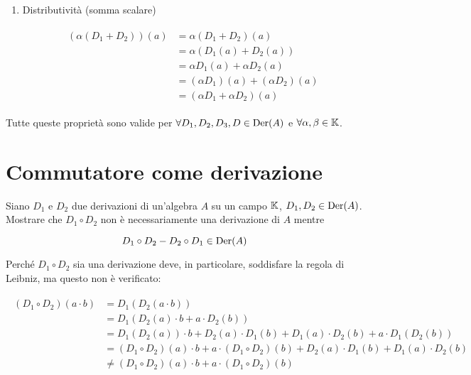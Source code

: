 \begin{enumerate}
	\item Distributività (somma scalare)
	
	\begin{align}
		\begin{split}
			(\alpha (D_{1} + D_{2})) (a) &= \alpha (D_{1} + D_{2}) (a)\\
			&= \alpha (D_{1} (a) + D_{2} (a))\\
			&= \alpha D_{1} (a) + \alpha D_{2} (a)\\
			&= (\alpha D_{1}) (a) + (\alpha D_{2}) (a)\\
			&= (\alpha D_{1} + \alpha D_{2}) (a)
		\end{split}
	\end{align}
\end{enumerate}

Tutte queste proprietà sono valide per $ \forall D_{1}, D_{2}, D_{3}, D \in \operatorname{Der}(A) $ e $ \forall \alpha, \beta \in \mathbb{K} $.

%

\newpage

%

\section{Commutatore come derivazione}\label{es1-11}

\begin{tcolorbox}
	Siano $ D_{1} $ e $ D_{2} $ due derivazioni di un'algebra $ A $ su un campo $ \mathbb{K} $, \ie $ D_{1},D_{2} \in \operatorname{Der}(A) $. Mostrare che $ D_{1} \circ D_{2} $ non è necessariamente una derivazione di $ A $ mentre
	
	\begin{equation}
		D_{1} \circ D_{2} - D_{2} \circ D_{1} \in \operatorname{Der}(A)
	\end{equation}
\end{tcolorbox}

Perché $ D_{1} \circ D_{2} $ sia una derivazione deve, in particolare, soddisfare la regola di Leibniz, ma questo non è verificato:

\begin{align}
	\begin{split}
		(D_{1} \circ D_{2})(a \cdot b) &= D_{1}(D_{2}(a \cdot b))\\
		&= D_{1}( D_{2}(a) \cdot b + a \cdot D_{2}(b) )\\
		&= D_{1}(D_{2}(a)) \cdot b + D_{2}(a) \cdot D_{1}(b) + D_{1}(a) \cdot D_{2}(b) + a \cdot D_{1}(D_{2}(b))\\
		&= (D_{1} \circ D_{2})(a) \cdot b + a \cdot (D_{1} \circ D_{2})(b) + D_{2}(a) \cdot D_{1}(b) + D_{1}(a) \cdot D_{2}(b)\\
		&\neq (D_{1} \circ D_{2})(a) \cdot b + a \cdot (D_{1} \circ D_{2})(b)
	\end{split}
\end{align}

